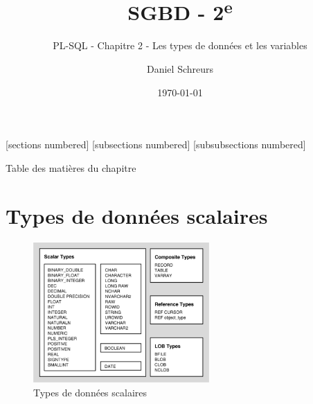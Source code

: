 \documentclass[10pt]{beamer}
\title{SGBD - 2\textsuperscript{e}}
\subtitle{PL-SQL - Chapitre 2 - Les types de données et les variables}
\date{\today}
\author{Daniel Schreurs}
\institute{Haute École de la Province de Liège}
\begin{document}
\maketitle

[sections numbered]
[subsections numbered]
[subsubsections numbered]
\begin{frame}[allowframebreaks]{Table des matières du chapitre}
    \tableofcontents[subsectionstyle=show/show/hide,subsubsectionstyle=show/show/hide,]
\end{frame}

\section{Types de données scalaires}
\tocss
\begin{frame}{\secname}
    \begin{figure}
        \begin{center}
            \includegraphics[width=0.60\textwidth]{../assets/img/scalar-type.png}
            \caption{Types de données scalaires}
        \end{center}
    \end{figure}
\end{frame}
\end{document}
